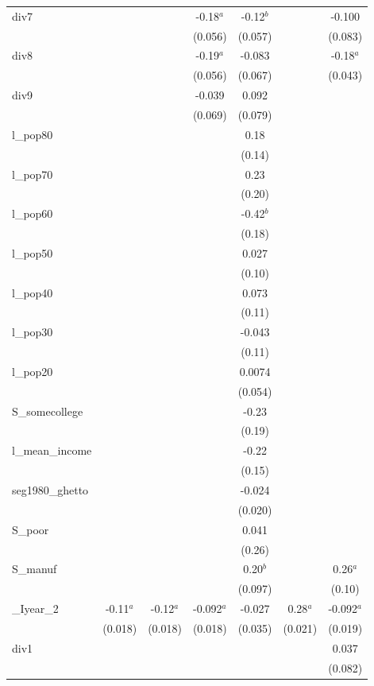 \documentclass[]{article}
\begin{document}
\begin{tabular}{lcccccc}
div7 &  &  & -0.18$^a$ & -0.12$^b$ &  & -0.100 \\
 &  &  & (0.056) & (0.057) &  & (0.083) \\
div8 &  &  & -0.19$^a$ & -0.083 &  & -0.18$^a$ \\
 &  &  & (0.056) & (0.067) &  & (0.043) \\
div9 &  &  & -0.039 & 0.092 &  &  \\
 &  &  & (0.069) & (0.079) &  &  \\
l\_pop80 &  &  &  & 0.18 &  &  \\
 &  &  &  & (0.14) &  &  \\
l\_pop70 &  &  &  & 0.23 &  &  \\
 &  &  &  & (0.20) &  &  \\
l\_pop60 &  &  &  & -0.42$^b$ &  &  \\
 &  &  &  & (0.18) &  &  \\
l\_pop50 &  &  &  & 0.027 &  &  \\
 &  &  &  & (0.10) &  &  \\
l\_pop40 &  &  &  & 0.073 &  &  \\
 &  &  &  & (0.11) &  &  \\
l\_pop30 &  &  &  & -0.043 &  &  \\
 &  &  &  & (0.11) &  &  \\
l\_pop20 &  &  &  & 0.0074 &  &  \\
 &  &  &  & (0.054) &  &  \\
S\_somecollege &  &  &  & -0.23 &  &  \\
 &  &  &  & (0.19) &  &  \\
l\_mean\_income &  &  &  & -0.22 &  &  \\
 &  &  &  & (0.15) &  &  \\
seg1980\_ghetto &  &  &  & -0.024 &  &  \\
 &  &  &  & (0.020) &  &  \\
S\_poor &  &  &  & 0.041 &  &  \\
 &  &  &  & (0.26) &  &  \\
S\_manuf &  &  &  & 0.20$^b$ &  & 0.26$^a$ \\
 &  &  &  & (0.097) &  & (0.10) \\
\_Iyear\_2 & -0.11$^a$ & -0.12$^a$ & -0.092$^a$ & -0.027 & 0.28$^a$ & -0.092$^a$ \\
 & (0.018) & (0.018) & (0.018) & (0.035) & (0.021) & (0.019) \\
div1 &  &  &  &  &  & 0.037 \\
 &  &  &  &  &  & (0.082) \\

\end{tabular}
\end{document}
